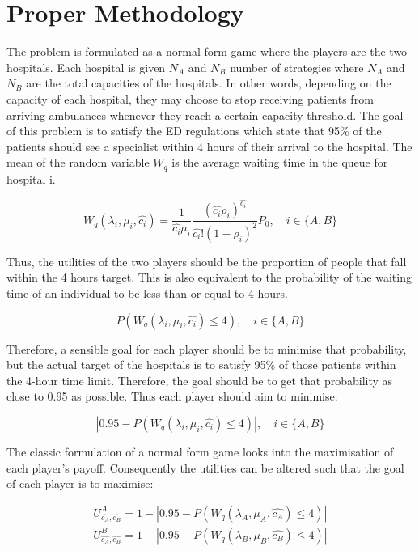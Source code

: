 \section{Proper Methodology}
The problem is formulated as a normal form game where the players are the two hospitals. 
Each hospital is given \( N_A \) and \( N_B \) number of strategies where \( N_A \) 
and \( N_B \) are the total capacities of the hospitals. 
In other words, depending on the capacity of each hospital, they may choose to stop 
receiving patients from arriving ambulances whenever they reach a certain capacity 
threshold. 
The goal of this problem is to satisfy the ED regulations which state that 95\% 
of the patients should see a specialist within 4 hours of their arrival to the hospital. 
The mean of the random variable \( W_q \) is the average waiting time in the queue 
for hospital i.


\begin{equation}
     W_q(\lambda_i, \mu_i, \hat{c_i}) = \frac{1}{\hat{c_i} \mu_i} 
     \frac{(\hat{c_i} \rho_i) ^ {\hat{c_i}}}{\hat{c_i}! (1 - \rho_i) ^ 2}P_0, 
     \quad i \in \{A,B\}
\end{equation}

Thus, the utilities of the two players should be the proportion of people that fall 
within the 4 hours target. 
This is also equivalent to the probability of the waiting time of an individual 
to be less than or equal to 4 hours. 

\begin{equation}
    P(W_q(\lambda_i, \mu_i, \hat{c_i}) \leq 4), \quad i \in \{A,B\}
\end{equation}

Therefore, a sensible goal for each player should be to minimise that probability, 
but the actual target of the hospitals is to satisfy 95\% of those patients within 
the 4-hour time limit. Therefore, the goal should be to get that probability as 
close to 0.95 as possible. 
Thus each player should aim to minimise:

\begin{equation}
    |0.95 - P(W_q(\lambda_i, \mu_i, \hat{c_i}) \leq 4)|, \quad i \in \{A,B\}
\end{equation}

The classic formulation of a normal form game looks into the maximisation of each 
player's payoff. 
Consequently the utilities can be altered such that the goal of each player is to 
maximise:

\begin{align}\label{Utilities}
    U_{\hat{c_A}, \hat{c_B}} ^ {A} = 1 - |0.95 - P(W_q(\lambda_A, \mu_A, \hat{c_A}) \leq 4)| \\
    U_{\hat{c_A}, \hat{c_B}} ^ {B} = 1 - |0.95 - P(W_q(\lambda_B, \mu_B, \hat{c_B}) \leq 4)|
\end{align}

